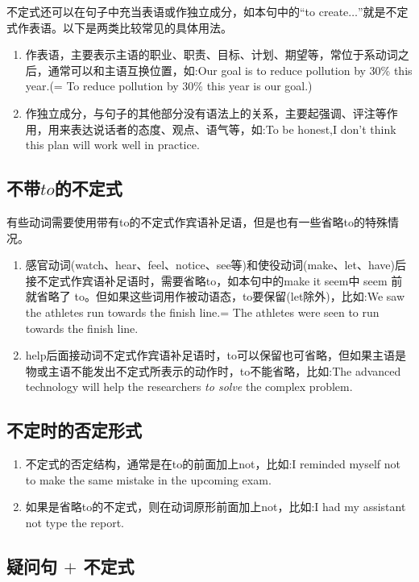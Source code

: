 不定式还可以在句子中充当表语或作独立成分，如本句中的“to create\(\ldots\)”就是不定式作表语。以下是两类比较常见的具体用法。
\begin{enumerate}
  \item 作表语，主要表示主语的职业、职责、目标、计划、期望等，常位于系动词之后，通常可以和主语互换位置，如:Our goal is to reduce pollution by 30\% this year.(= To reduce pollution by 30\% this year is our goal.)
  \item 作独立成分，与句子的其他部分没有语法上的关系，主要起强调、评注等作用，用来表达说话者的态度、观点、语气等，如:To be honest,I don't think this plan will work well in practice.
\end{enumerate}

\subsection{不带\(to\)的不定式}

有些动词需要使用带有to的不定式作宾语补足语，但是也有一些省略to的特殊情况。
\begin{enumerate}
  \item 感官动词(watch、hear、feel、notice、see等)和使役动词(make、let、have)后接不定式作宾语补足语时，需要省略to，如本句中的make it seem中 seem 前就省略了 to。但如果这些词用作被动语态，to要保留(let除外)，比如:We saw the athletes run towards the finish line.= The athletes were seen to run towards the finish line.
  \item help后面接动词不定式作宾语补足语时，to可以保留也可省略，但如果主语是物或主语不能发出不定式所表示的动作时，to不能省略，比如:The advanced technology will help the researchers \textit{to solve} the complex problem.
\end{enumerate}

\subsection{不定时的否定形式}

\begin{enumerate}
  \item 不定式的否定结构，通常是在to的前面加上not，比如:I reminded myself not to make the same mistake in the upcoming exam.
  \item 如果是省略to的不定式，则在动词原形前面加上not，比如:I had my assistant not type the report.
\end{enumerate}

\subsection{疑问句 \(+\) 不定式}


